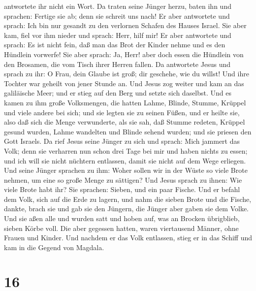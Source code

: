 antwortete ihr nicht ein Wort. Da traten seine Jünger herzu, baten ihn
und sprachen: Fertige sie ab; denn sie schreit uns nach! 
Er aber antwortete und sprach: Ich bin nur gesandt zu den verlornen
Schafen des Hauses Israel.  Sie aber kam, fiel vor ihm
nieder und sprach: Herr, hilf mir!  Er aber antwortete
und sprach: Es ist nicht fein, daß man das Brot der Kinder nehme und es
den Hündlein vorwerfe!  Sie aber sprach: Ja, Herr! aber
doch essen die Hündlein von den Brosamen, die vom Tisch ihrer Herren
fallen.  Da antwortete Jesus und sprach zu ihr: O Frau,
dein Glaube ist groß; dir geschehe, wie du willst! Und ihre Tochter war
geheilt von jener Stunde an.  Und Jesus zog weiter und
kam an das galiläische Meer; und er stieg auf den Berg und setzte sich
daselbst.  Und es kamen zu ihm große Volksmengen, die
hatten Lahme, Blinde, Stumme, Krüppel und viele andere bei sich; und sie
legten sie zu seinen Füßen, und er heilte sie,  also daß
sich die Menge verwunderte, als sie sah, daß Stumme redeten, Krüppel
gesund wurden, Lahme wandelten und Blinde sehend wurden; und sie priesen
den Gott Israels.  Da rief Jesus seine Jünger zu sich und
sprach: Mich jammert das Volk; denn sie verharren nun schon drei Tage
bei mir und haben nichts zu essen; und ich will sie nicht nüchtern
entlassen, damit sie nicht auf dem Wege erliegen.  Und
seine Jünger sprachen zu ihm: Woher sollen wir in der Wüste so viele
Brote nehmen, um eine so große Menge zu sättigen?  Und
Jesus sprach zu ihnen: Wie viele Brote habt ihr? Sie sprachen: Sieben,
und ein paar Fische.  Und er befahl dem Volk, sich auf
die Erde zu lagern,  und nahm die sieben Brote und die
Fische, dankte, brach sie und gab sie den Jüngern, die Jünger aber gaben
sie dem Volke.  Und sie aßen alle und wurden satt und
hoben auf, was an Brocken übrigblieb, sieben Körbe voll. 
Die aber gegessen hatten, waren viertausend Männer, ohne Frauen und
Kinder.  Und nachdem er das Volk entlassen, stieg er in
das Schiff und kam in die Gegend von Magdala.

\hypertarget{section-15}{%
\section{16}\label{section-15}}

